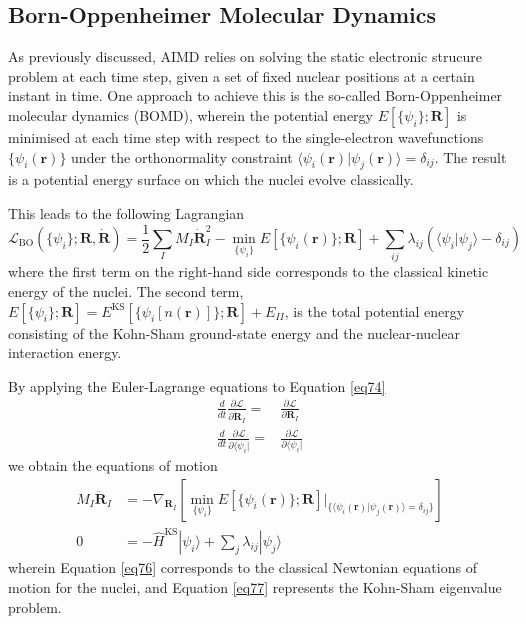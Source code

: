\subsection{Born-Oppenheimer Molecular Dynamics}
As previously discussed, AIMD relies on solving the static electronic strucure 
problem at each time step, given a set of fixed nuclear positions at a certain instant in time.
One approach to achieve this is the so-called Born-Oppenheimer molecular dynamics 
(BOMD)\supercite{Kuhne2014}, wherein the potential energy $E[\{\psi_{i}\}; \mathbf{R}]$ 
is minimised at each time step with respect to the single-electron wavefunctions
$\{\psi_{i}(\mathbf{r})\}$ under the orthonormality constraint 
$\langle \psi_i(\mathbf{r}) | \psi_j(\mathbf{r}) \rangle = \delta_{ij}$. 
The result is a potential energy surface on which the nuclei evolve classically.


This leads to the following Lagrangian
\begin{equation}
    \label{eq74}
    \mathcal{L}_{\text{BO}}(\{\psi_{i}\}; \mathbf{R}, \dot{\mathbf{R}}) =
    \frac{1}{2}\sum_{I} M_{I} \dot{\mathbf{R}}_{I}^2 - \min_{\{\psi_{i}\}} E[\{\psi_{i}(\mathbf{r})\}; \mathbf{R}]
    + \sum_{ij} \lambda_{ij} \left( \langle \psi_i | \psi_j \rangle - \delta_{ij} \right)
\end{equation}
where the first term on the right-hand side corresponds to the classical kinetic energy 
of the nuclei. The second term,
$E[\{\psi_{i}\}; \mathbf{R}] = E^{\text{KS}}[\{\psi_{i}[n(\mathbf{r})]\}; \mathbf{R}] + E_{II}$, is the total 
potential energy consisting of the Kohn-Sham ground-state energy and the 
nuclear-nuclear interaction energy.

By applying the Euler-Lagrange equations to Equation \ref{eq74}
\begin{equation}
    \label{eq75}
\begin{aligned}
    \frac{d}{dt}\frac{\partial \mathcal{L}}{\partial \dot{\mathbf{R}}_{I}} =& \frac{\partial \mathcal{L}}{\partial \mathbf{R}_{I}} \\
    \frac{d}{dt}\frac{\partial \mathcal{L}}{\partial \langle\dot{\psi}_{i}|} =& \frac{\partial \mathcal{L}}{\partial \langle\psi_{i}|}
\end{aligned}
\end{equation}
we obtain the equations of motion 
    \begin{align}
        M_{I}\ddot{\mathbf{R}}_{I} &= -\nabla_{\mathbf{R}_{I}} \left[\min_{\{\psi_{i}\}} E[\{\psi_{i}(\mathbf{r})\}; \mathbf{R}]\bigg|_{\{\langle \psi_i(\mathbf{r}) | \psi_j(\mathbf{r}) \rangle = \delta_{ij}\}} \right]\label{eq76} \\
        0 &= -\hat{H}^{\text{KS}}|\psi_{i}\rangle  + \sum_{j} \lambda_{ij} | \psi_j \rangle \label{eq77}
    \end{align}
wherein Equation \ref{eq76} corresponds to the classical Newtonian equations of motion for the 
nuclei, and Equation \ref{eq77} represents the Kohn-Sham eigenvalue problem.  

